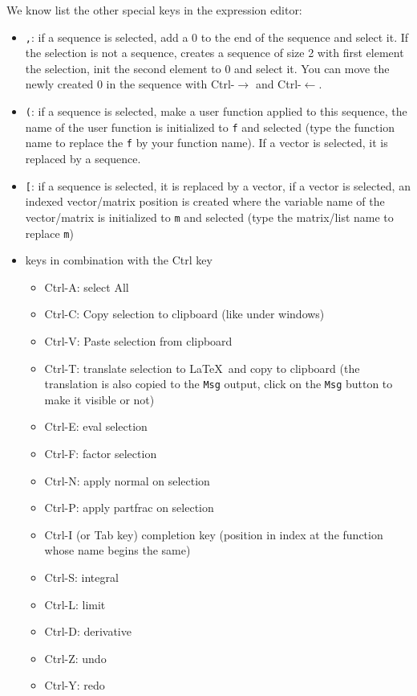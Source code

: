\documentclass{article}
\begin{document}
We know list the other special keys in the expression editor:
\begin{itemize}
\item \verb|,|: if a sequence is selected, add a 0 to the end of the
sequence and select it. If the selection is not a sequence, creates
a sequence of size 2 with first element the selection, init the second
element to 0 and select it. You can move the newly created 0 in the
sequence with Ctrl-$\rightarrow$ and Ctrl-$\leftarrow$.
\item \verb|(|: if a sequence is selected, make a user function
applied to this sequence, the name of the user function is initialized
to \verb|f| and selected (type the function name to replace 
the \verb|f| by your function name). If a vector is selected, it is replaced
by a sequence.
\item \verb|[|: if a sequence is selected, it is replaced by a vector,
if a vector is selected, an indexed vector/matrix position is created
where the variable name of the vector/matrix is initialized to
\verb|m| and selected (type the matrix/list name to replace \verb|m|)
\item keys in combination with the Ctrl key
\begin{itemize}
\item Ctrl-A: select All
\item Ctrl-C: Copy selection to clipboard (like under windows)
\item Ctrl-V: Paste selection from clipboard
\item Ctrl-T: translate selection to \LaTeX\ and copy to clipboard
(the translation is also copied to the \verb|Msg| output, click
on the \verb|Msg| button to make it visible or not)
\item Ctrl-E: eval selection
\item Ctrl-F: factor selection
\item Ctrl-N: apply normal on selection
\item Ctrl-P: apply partfrac on selection
\item Ctrl-I (or Tab key) completion key (position in index at the function
whose name begins the same)
\item Ctrl-S: integral
\item Ctrl-L: limit
\item Ctrl-D: derivative
\item Ctrl-Z: undo
\item Ctrl-Y: redo
\end{itemize}
\end{itemize}
\end{document}
